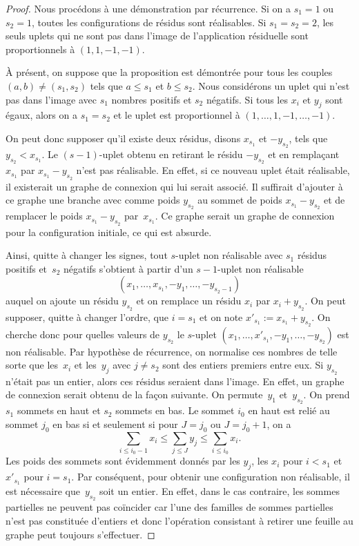 \documentclass[11pt]{article}
\numberwithin{equation}{section}\renewcommand{\proofname}{Démonstration}
\theoremstyle{definition}
\begin{document}
\begin{proof}
Nous procédons à une démonstration par récurrence.
Si on a $s_{1}=1$ ou $s_{2}=1$, toutes les configurations de résidus sont réalisables. Si $s_{1}=s_{2}=2$, les seuls uplets qui ne sont pas dans l'image de l'application résiduelle sont proportionnels à $(1,1,-1,-1)$.

À présent, on suppose que la proposition est démontrée pour tous les couples $(a,b)\neq (s_{1},s_{2})$ tels que $a \leq s_{1}$ et $b \leq s_{2}$. Nous considérons un uplet qui n'est pas dans l'image avec $s_{1}$ nombres positifs et $s_{2}$ négatifs. Si tous les $x_{i}$ et $y_{j}$ sont égaux, alors on a $s_{1}=s_{2}$ et le uplet est proportionnel à $(1,\dots,1,-1,\dots,-1)$.

On peut donc supposer qu'il existe deux résidus, disons $x_{s_{1}}$ et $-y_{s_{2}}$, tels que \hbox{$y_{s_{2}}<x_{s_{1}}$}. Le $(s-1)$-uplet obtenu en retirant le résidu $-y_{s_{2}}$ et en remplaçant $x_{s_{1}}$ par $x_{s_{1}}-y_{s_{2}}$ n'est pas réalisable. En effet, si ce nouveau uplet était réalisable, il existerait un graphe de connexion qui lui serait associé. Il suffirait d'ajouter à ce graphe une branche avec comme poids $y_{s_{2}}$ au sommet de poids $x_{s_{1}}-y_{s_{2}}$ et de remplacer le poids $x_{s_{1}}-y_{s_{2}}$ par~$x_{s_{1}}$. Ce graphe serait un graphe de connexion pour la configuration initiale, ce qui est absurde.

Ainsi, quitte à changer les signes, tout $s$-uplet non réalisable avec $s_{1}$ résidus positifs et~$s_{2}$ négatifs s'obtient à partir d'un $s-1$-uplet non réalisable
\[
(x_{1},\dots,x_{s_{1}},-y_{1},\dots,-y_{s_{2}-1})
\]
auquel on ajoute un résidu $y_{s_{2}}$ et on remplace un résidu $x_{i}$ par $x_{i}+y_{s_{2}}$. On peut supposer, quitte à changer l'ordre, que $i=s_{1}$ et on note $x'_{s_{1}}:=x_{s_{1}}+y_{s_{2}}$.
On cherche donc pour quelles valeurs de $y_{s_{2}}$ le $s$-uplet $(x_{1},\dots,x'_{s_{1}},-y_{1},\dots,-y_{s_{2}})$ est non réalisable. Par hypothèse de récurrence, on normalise ces nombres de telle sorte que les~$x_{i}$ et les~$y_{j}$ avec $j\neq s_{2}$ sont des entiers premiers entre eux.
Si $y_{s_{2}}$ n'était pas un entier, alors ces résidus seraient dans l'image. En effet, un graphe de connexion serait obtenu de la façon suivante. On permute~$y_{1}$ et~$y_{s_{2}}$. On prend $s_{1}$ sommets en haut et $s_{2}$ sommets en bas. Le sommet $i_{0}$ en haut est relié au sommet $j_{0}$ en bas si et seulement si pour $J=j_{0}$ ou $J=j_{0}+1$, on a
\[
 \sum_{i\leq i_{0}-1}x_{i}\leq \sum_{j\leq J} y_{j} \leq \sum_{i\leq i_{0}}x_{i}.\]
Les poids des sommets sont évidemment donnés par les $y_{j}$, les $x_{i}$ pour $i<s_{1}$ et~$x'_{s_{1}}$ pour $i=s_{1}$.
Par conséquent, pour obtenir une configuration non réalisable, il est nécessaire que~$y_{s_{2}}$ soit un entier. En effet, dans le cas contraire, les sommes partielles ne peuvent pas coïncider car l'une des familles de sommes partielles n'est pas constituée d'entiers et donc l'opération consistant à retirer une feuille au graphe peut toujours s'effectuer.
\end{proof}
\end{document}
